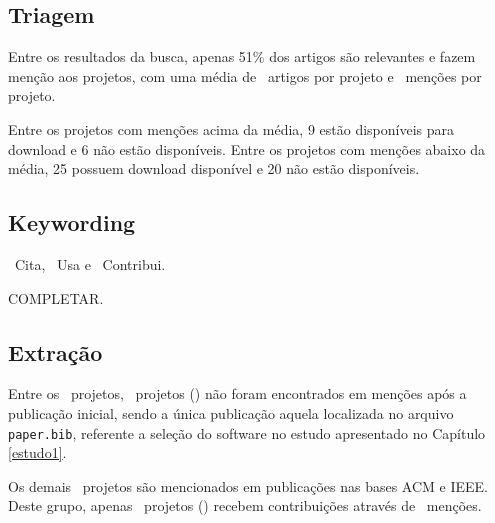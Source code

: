\subsection{Triagem}

Entre os resultados da busca, apenas 51\% dos artigos são relevantes e fazem
menção aos projetos, com uma média de \ScreeningUniqueMean \ artigos por projeto
e \ScreeningMean \ menções por projeto.

Entre os projetos com menções acima da média, 9 estão disponíveis para download
e 6 não estão disponíveis. Entre os projetos com menções abaixo da média, 25
possuem download disponível e 20 não estão disponíveis.



\subsection{Keywording}

\CiteCount \ Cita,
\UseCount \ Usa e
\ContributeCount \ Contribui.

COMPLETAR.

\subsection{Extração}

Entre os \SoftwareCount \ projetos, \SoftwareNotMentionedCount \ projetos
() não foram encontrados em menções
após a publicação inicial, sendo a única publicação aquela localizada no
arquivo \texttt{paper.bib}, referente a seleção do software no estudo
apresentado no Capítulo \ref{estudo1}.

Os demais \MentionsStudyDois \ projetos são mencionados em publicações nas
bases ACM e IEEE. Deste grupo, apenas \ContributeStudyDoisSoftware \ projetos
() recebem contribuições através de
\ContributeStudyDoisCount \ menções.

